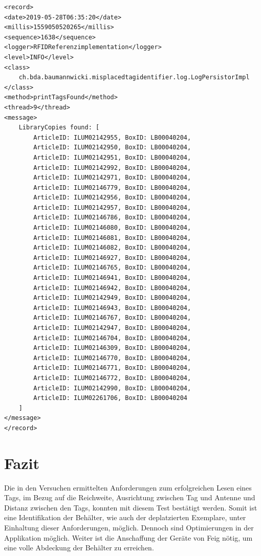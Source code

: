 \documentclass[parskip=full, a4paper]{scrartcl}
\begin{document}
\begin{lstlisting}
<record>
<date>2019-05-28T06:35:20</date>
<millis>1559050520265</millis>
<sequence>1638</sequence>
<logger>RFIDReferenzimplementation</logger>
<level>INFO</level>
<class>
	ch.bda.baumannwicki.misplacedtagidentifier.log.LogPersistorImpl
</class>
<method>printTagsFound</method>
<thread>9</thread>
<message>
	LibraryCopies found: [
		ArticleID: ILUM02142955, BoxID: LB00040204,
		ArticleID: ILUM02142950, BoxID: LB00040204,
		ArticleID: ILUM02142951, BoxID: LB00040204,
		ArticleID: ILUM02142992, BoxID: LB00040204,
		ArticleID: ILUM02142971, BoxID: LB00040204,
		ArticleID: ILUM02146779, BoxID: LB00040204,
		ArticleID: ILUM02142956, BoxID: LB00040204,
		ArticleID: ILUM02142957, BoxID: LB00040204,
		ArticleID: ILUM02146786, BoxID: LB00040204,
		ArticleID: ILUM02146080, BoxID: LB00040204,
		ArticleID: ILUM02146081, BoxID: LB00040204,
		ArticleID: ILUM02146082, BoxID: LB00040204,
		ArticleID: ILUM02146927, BoxID: LB00040204,
		ArticleID: ILUM02146765, BoxID: LB00040204,
		ArticleID: ILUM02146941, BoxID: LB00040204,
		ArticleID: ILUM02146942, BoxID: LB00040204,
		ArticleID: ILUM02142949, BoxID: LB00040204,
		ArticleID: ILUM02146943, BoxID: LB00040204,
		ArticleID: ILUM02146767, BoxID: LB00040204,
		ArticleID: ILUM02142947, BoxID: LB00040204,
		ArticleID: ILUM02146704, BoxID: LB00040204,
		ArticleID: ILUM02146309, BoxID: LB00040204,
		ArticleID: ILUM02146770, BoxID: LB00040204,
		ArticleID: ILUM02146771, BoxID: LB00040204,
		ArticleID: ILUM02146772, BoxID: LB00040204,
		ArticleID: ILUM02142990, BoxID: LB00040204,
		ArticleID: ILUM02261706, BoxID: LB00040204
	]
</message>
</record>
\end{lstlisting}

\section{Fazit}
Die in den Versuchen ermittelten Anforderungen zum erfolgreichen Lesen eines Tags, im Bezug auf die Reichweite, Ausrichtung zwischen Tag und Antenne und Distanz zwischen den Tags, konnten mit diesem Test bestätigt werden. Somit ist eine Identifikation der Behälter, wie auch der deplatzierten Exemplare, unter Einhaltung dieser Anforderungen, möglich. Dennoch sind Optimierungen in der Applikation möglich. Weiter ist die Anschaffung der Geräte von Feig nötig, um eine volle Abdeckung der Behälter zu erreichen.
\end{document}
